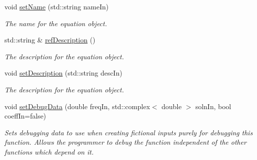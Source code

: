 \begin{DoxyCompactItemize}
void \hyperlink{classosea_1_1ofreq_1_1_equationof_motion_a1dba2d5b5a3d8c156c010ccb39c3bbe0}{set\-Name} (std\-::string name\-In)
\begin{DoxyCompactList}\small\item\em The name for the equation object. \end{DoxyCompactList}\item 
std\-::string \& \hyperlink{classosea_1_1ofreq_1_1_equationof_motion_a5be5a333dd1a5a65eaadec4b32c68fb5}{ref\-Description} ()
\begin{DoxyCompactList}\small\item\em The description for the equation object. \end{DoxyCompactList}\item 
void \hyperlink{classosea_1_1ofreq_1_1_equationof_motion_a307e0f8ada534f1fb17c06073101f8ab}{set\-Description} (std\-::string desc\-In)
\begin{DoxyCompactList}\small\item\em The description for the equation object. \end{DoxyCompactList}\item 
void \hyperlink{classosea_1_1ofreq_1_1_equationof_motion_a91bffb1d1129135369d6120033232b5c}{set\-Debug\-Data} (double freq\-In, std\-::complex$<$ double $>$ soln\-In, bool coeff\-In=false)
\begin{DoxyCompactList}\small\item\em Sets debugging data to use when creating fictional inputs purely for debugging this function. Allows the programmer to debug the function independent of the other functions which depend on it. \end{DoxyCompactList}\end{DoxyCompactItemize}
